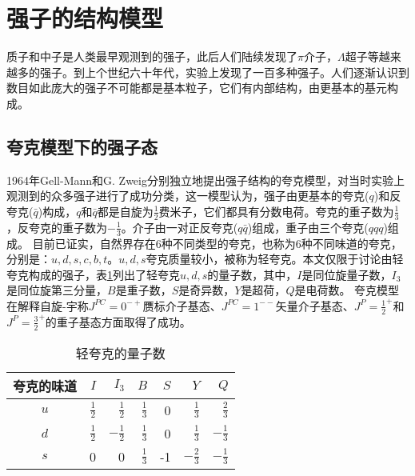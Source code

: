\section{强子的结构模型}%
质子和中子是人类最早观测到的强子，此后人们陆续发现了$\pi$介子，$\Lambda$超子等越来越多的强子。到上个世纪六十年代，实验上发现了一百多种强子。人们逐渐认识到数目如此庞大的强子不可能都是基本粒子，它们有内部结构，由更基本的基元构成。\vspace{-0.5cm}
\subsection{夸克模型下的强子态}
1964年Gell-Mann和G. Zweig分别独立地提出强子结构的夸克模型\cite{GellMann:1964nj,Zweig:1981pd,Zweig:1964jf}，对当时实验上观测到的众多强子进行了成功分类，这一模型认为，强子由更基本的夸克($q$)和反夸克($\bar{q}$)构成，$q$和$\bar{q}$都是自旋为$\frac{1}{2}$费米子，它们都具有分数电荷。夸克的重子数为$\frac{1}{3}$，反夸克的重子数为$-\frac{1}{3}$。介子由一对正反夸克($q\bar{q}$)组成，重子由三个夸克($qqq$)组成。
目前已证实，自然界存在6种不同类型的夸克，也称为6种不同味道的夸克，分别是：$u,d,s,c,b,t$。$u,d,s$夸克质量较小，被称为轻夸克。本文仅限于讨论由轻夸克构成的强子，表\ref{uds quark}列出了轻夸克$u,d,s$的量子数，其中，$I$是同位旋量子数，$I_{3}$是同位旋第三分量，$B$是重子数，$S$是奇异数，$Y$是超荷，$Q$是电荷数。
夸克模型在解释自旋-宇称$J^{PC}=0^{-+}$赝标介子基态、$J^{PC}=1^{--}$矢量介子基态、$J^{P}=\frac{1}{2}^{+}$和$J^{P}=\frac{3}{2}^{+}$的重子基态方面取得了成功。
\begin{table}[h]
\centering
\caption{轻夸克的量子数}
\label{uds quark}
\begin{spacing}{1.5}
\setlength{\tabcolsep}{8mm}
\begin{tabular}{crrrrrr}
\toprule
\hline
	夸克的味道 & $I$ & $I_{3}$ & $B$ & $S$ & $Y$ & $Q$\\
	\hline
	$u$ & $\frac{1}{2}$ & $\frac{1}{2}$ & $\frac{1}{3}$ & 0 & $\frac{1}{3}$ & $\frac{2}{3}$\\
	$d$ & $\frac{1}{2}$ & $-\frac{1}{2}$ & $\frac{1}{3}$ & 0 & $\frac{1}{3}$ & $-\frac{1}{3}$\\
	$s$ & 0 & 0 & $\frac{1}{3}$ & -1 & $-\frac{2}{3}$ & $-\frac{1}{3}$\\
	\hline
\bottomrule
\end{tabular}
\end{spacing}
\end{table}
